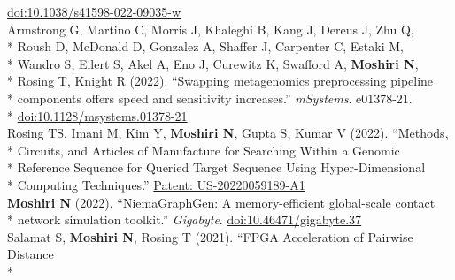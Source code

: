 \documentclass[margin,line]{res}
\begin{document}
\begin{resume}
\hspace*{8mm} \href{https://doi.org/10.1038/s41598-022-09035-w}{doi:10.1038/s41598-022-09035-w}\\
\hspace*{4mm} Armstrong G, Martino C, Morris J, Khaleghi B, Kang J, Dereus J, Zhu Q,\\*
\hspace*{9mm} Roush D, McDonald D, Gonzalez A, Shaffer J, Carpenter C, Estaki M,\\*
\hspace*{9mm} Wandro S, Eilert S, Akel A, Eno J, Curewitz K, Swafford A, \textbf{Moshiri N},\\*
\hspace*{9mm} Rosing T, Knight R (2022). ``Swapping metagenomics preprocessing pipeline\\*
\hspace*{9mm} components offers speed and sensitivity increases.'' \textit{mSystems}. e01378-21.\\*\vspace{2mm}
\hspace*{8mm} \href{https://doi.org/10.1128/msystems.01378-21}{doi:10.1128/msystems.01378-21}\\
\hspace*{4mm} Rosing TS, Imani M, Kim Y, \textbf{Moshiri N}, Gupta S, Kumar V (2022). ``Methods,\\*
\hspace*{9mm} Circuits, and Articles of Manufacture for Searching Within a Genomic\\*
\hspace*{9mm} Reference Sequence for Queried Target Sequence Using Hyper-Dimensional\\*\vspace{2mm}
\hspace*{8mm} Computing Techniques.'' \href{https://patents.google.com/patent/US20220059189A1}{Patent: US-20220059189-A1}\\
\hspace*{4mm} \textbf{Moshiri N} (2022). ``NiemaGraphGen: A memory-efficient global-scale contact\\*\vspace{2mm}
\hspace*{8mm} network simulation toolkit.'' \textit{Gigabyte}. \href{https://doi.org/10.46471/gigabyte.37}{doi:10.46471/gigabyte.37}\\
\hspace*{4mm} Salamat S, \textbf{Moshiri N}, Rosing T (2021). ``FPGA Acceleration of Pairwise Distance\\*

\end{resume}
\end{document}
